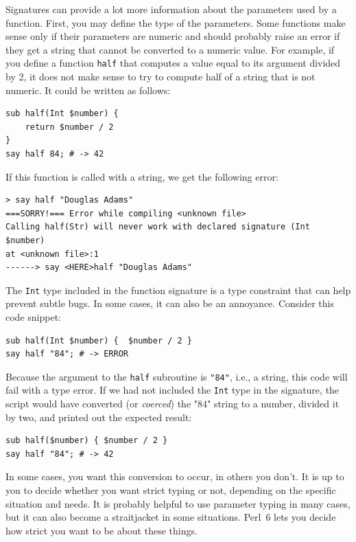 Signatures can provide a lot more information about the 
parameters used by a function. First, you may define the 
type of the parameters. Some functions make sense only if their 
parameters are numeric and should probably raise an error if 
they get a string that cannot be converted to a numeric value. 
For example, if you define a function {\tt half} that computes 
a value equal to its argument divided by 2, it does not make 
sense to try to compute half of a string that is not numeric. 
It could be written as follows:

\begin{verbatim}
sub half(Int $number) { 
    return $number / 2 
}
say half 84; # -> 42
\end{verbatim}

If this function is called with a string, we get the 
following error:

\begin{verbatim}
> say half "Douglas Adams"
===SORRY!=== Error while compiling <unknown file>
Calling half(Str) will never work with declared signature (Int $number)
at <unknown file>:1
------> say <HERE>half "Douglas Adams"
\end{verbatim}

The {\tt Int} type included in the function signature is a type 
constraint that can help prevent subtle bugs. In some cases, 
it can also be an annoyance. Consider this code snippet:


\begin{verbatim}
sub half(Int $number) {  $number / 2 }
say half "84"; # -> ERROR
\end{verbatim}

Because the argument to the {\tt half} subroutine is {\tt "84"}, 
i.e., a string, this code will fail with a type error. If we had 
not included the {\tt Int} type in the signature, the script 
would have converted (or \emph{coerced}) the "84" string to 
a number, divided it by two, and printed out the expected result:

\begin{verbatim}
sub half($number) { $number / 2 }
say half "84"; # -> 42
\end{verbatim}

In some cases, you want this conversion to occur, in others 
you don't. It is up to you to decide whether you want 
strict typing or not, depending on the specific situation and
needs. It is probably helpful to use parameter typing in many 
cases, but it can also become a straitjacket in some situations. 
Perl~6 lets you decide how strict you want to be about these things.

